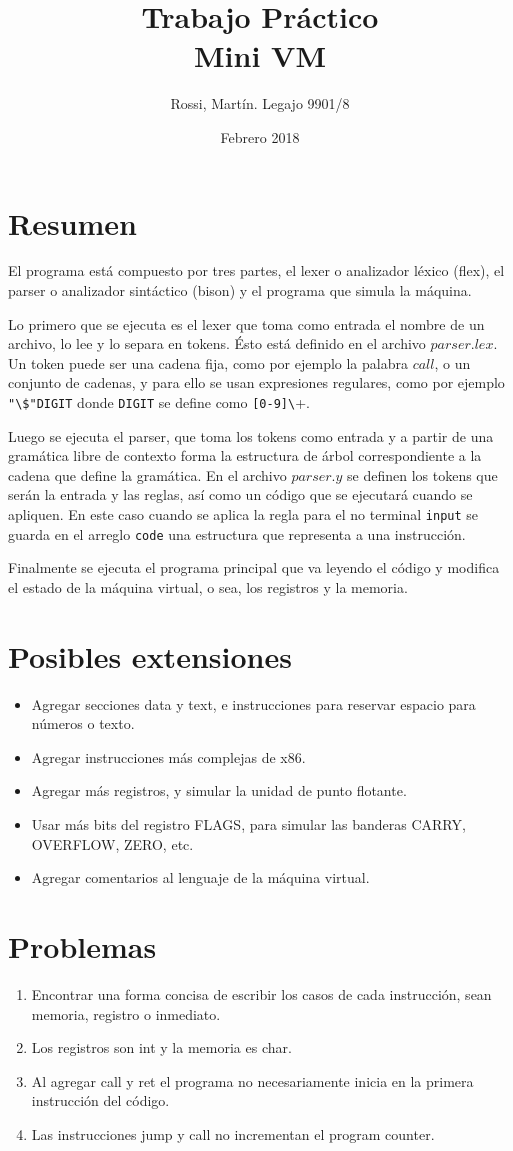 \documentclass[12pt]{article}
\title{{\textbf{\Large{Trabajo Práctico}\\Mini VM}}}
\author{Rossi, Martín. Legajo 9901/8}
\date{Febrero 2018}
\begin{document}
\maketitle
\section*{Resumen}
\indent El programa está compuesto por tres partes, el lexer o analizador léxico (flex), el parser o analizador sintáctico (bison) y el programa que simula la máquina.\par Lo primero que se ejecuta es el lexer que toma como entrada el nombre de un archivo, lo lee y lo separa en tokens. Ésto está definido en el archivo $parser.lex$. Un token puede ser una cadena fija, como por ejemplo la palabra $call$, o un conjunto de cadenas, y para ello se usan expresiones regulares, como por ejemplo \verb+"\$"DIGIT+ donde \verb+DIGIT+ se define como \verb+[0-9]\++.\par Luego se ejecuta el parser, que toma los tokens como entrada y a partir de una gramática libre de contexto forma la estructura de árbol correspondiente a la cadena que define la gramática. En el archivo $parser.y$ se definen los tokens que serán la entrada y las reglas, así como un código que se ejecutará cuando se apliquen. En este caso cuando se aplica la regla para el no terminal \verb+input+ se guarda en el arreglo \verb+code+ una estructura que representa a una instrucción.\par Finalmente se ejecuta el programa principal que va leyendo el código y modifica el estado de la máquina virtual, o sea, los registros y la memoria.
\section*{Posibles extensiones}
\begin{itemize}
\item Agregar secciones data y text, e instrucciones para reservar espacio para números o texto.
\item Agregar instrucciones más complejas de x86.
\item Agregar más registros, y simular la unidad de punto flotante.
\item Usar más bits del registro FLAGS, para simular las banderas CARRY, OVERFLOW, ZERO, etc.
\item Agregar comentarios al lenguaje de la máquina virtual.
\end{itemize}
\section*{Problemas}
\begin{enumerate}
\item Encontrar una forma concisa de escribir los casos de cada instrucción, sean memoria, registro o inmediato.
\item Los registros son int y la memoria es char.
\item Al agregar call y ret el programa no necesariamente inicia en la primera instrucción del código.
\item Las instrucciones jump y call no incrementan el program counter.
\end{enumerate}
\end{document}
